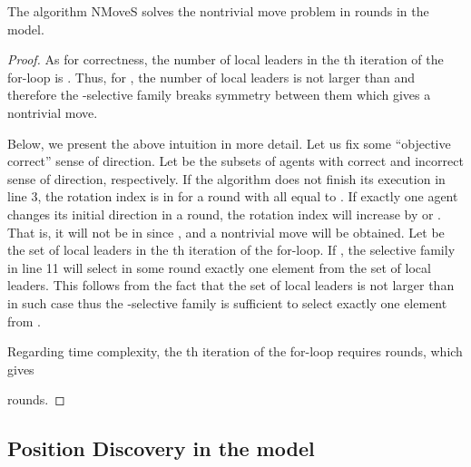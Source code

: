 \begin{lemma}
The algorithm NMoveS solves the nontrivial move problem in  rounds
in the {\perceptive} model.
\end{lemma}
\iffull
\begin{proof}
As for correctness, the number of local leaders in the th iteration of the
for-loop is . Thus, for , the number of local leaders
is not larger than  and therefore the -selective family breaks symmetry
between them which gives a nontrivial move. 



Below, we present the above intuition in more detail.
Let us fix some ``objective correct'' sense of direction.
Let  be the subsets of agents with correct and 
incorrect sense of direction, respectively.
If the algorithm does not finish its execution in line 3,
the rotation index is in  for a round with all  equal to
{\lleft}. If exactly one agent changes its initial direction in
a round, the rotation index will increase by  or .
That is, it will not be in  since ,
and a nontrivial move will be obtained.
Let  be the set of local leaders in the th iteration of the for-loop.
If , the selective family in line 11 will select in some
round exactly one element from the set of local leaders. This follows
from the fact that the set of local leaders is not larger than 
in such case thus the -selective family is sufficient to select
exactly one element from .

Regarding time complexity, the th iteration of the for-loop requires
 rounds, which gives

rounds. 
\end{proof}
\else
\fi


\subsection{Position Discovery in the {\perceptive} model}

